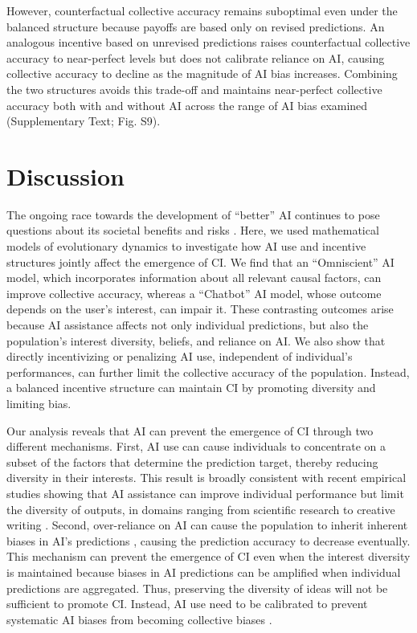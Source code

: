 \documentclass[12pt]{article}
\begin{document}
However, counterfactual collective accuracy remains suboptimal even under the balanced structure because payoffs are based only on revised predictions. 
An analogous incentive based on unrevised predictions raises counterfactual collective accuracy to near-perfect levels but does not calibrate reliance on AI, causing collective accuracy to decline as the magnitude of AI bias increases. 
Combining the two structures avoids this trade-off and maintains near-perfect collective accuracy both with and without AI across the range of AI bias examined (Supplementary Text; Fig. S9).

\section*{Discussion}

The ongoing race towards the development of ``better'' AI continues to pose questions about its societal benefits and risks \citep{bender2021dangers,burton2024large,cui2024ai}.
Here, we used mathematical models of evolutionary dynamics to investigate how AI use and incentive structures jointly affect the emergence of CI.
We find that an ``Omniscient'' AI model, which incorporates information about all relevant causal factors, can improve collective accuracy, whereas a ``Chatbot'' AI model, whose outcome depends on the user's interest, can impair it.
These contrasting outcomes arise because AI assistance affects not only individual predictions, but also the population's interest diversity, beliefs, and reliance on AI.
We also show that directly incentivizing or penalizing AI use, independent of individual's performances, can further limit the collective accuracy of the population. 
Instead, a balanced incentive structure can maintain CI by promoting diversity and limiting bias.

Our analysis reveals that AI can prevent the emergence of CI through two different mechanisms.
First, AI use can cause individuals to concentrate on a subset of the factors that determine the prediction target, thereby reducing diversity in their interests.
This result is broadly consistent with recent empirical studies showing that AI assistance can improve individual performance but limit the diversity of outputs, in domains ranging from scientific research \citep{hao2026artificial} to creative writing \citep{doshi2024generative}.
Second, over-reliance on AI can cause the population to inherit inherent biases in AI's predictions \citep{fugener2021will,vicente2023humans}, causing the prediction accuracy to decrease eventually.
This mechanism can prevent the emergence of CI even when the interest diversity is maintained because biases in AI predictions can be amplified when individual predictions are aggregated.
Thus, preserving the diversity of ideas will not be sufficient to promote CI.
Instead, AI use need to be calibrated to prevent systematic AI biases from becoming collective biases \citep{buccinca2021trust}.
\end{document}

